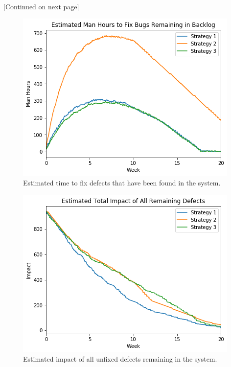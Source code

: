 \documentclass[12pt,a4paper]{article}
\begin{document}
	\begin{center}
		\vspace{4cm}
		[Continued on next page]
	\end{center}

	\begin{figure}[p]
		\centering
		\includegraphics[scale=0.6]{sim_time_to_fix}
		\caption{Estimated time to fix defects that have been found in the system.}
	\end{figure}
	
	\begin{figure}[p]
		\centering
		\includegraphics[scale=0.6]{sim_impact}
		\caption{Estimated impact of all unfixed defects remaining in the system.}
	\end{figure}
	
\end{document}
